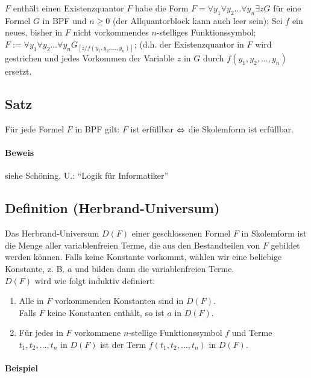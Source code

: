 \documentclass[a4paper,twoside,DIV15,BCOR12mm]{scrbook}
\begin{document}
\begin{codebox}
\li \While $F$ enthält einen Existenzquantor
\li     \Do
            $F$ habe die Form $F=\forall y_1\forall y_2\ldots\forall y_n\exists zG$ für eine Formel $G$ in BPF
\zi         und $n\geq 0$ (der Allquantorblock kann auch leer sein);
\li         Sei $f$ ein neues, bisher in $F$ nicht vorkommendes $n$-stelliges
\zi         Funktionssymbol;
\li         $F:=\forall y_1\forall y_2\ldots\forall y_nG_{[z/f(y_1,y_2,\ldots ,y_n)]}$; (d.h. der Existenzquantor in $F$ wird
\zi         gestrichen und jedes Vorkommen der Variable $z$ in $G$ durch 
\zi         $f(y_1,y_2,\ldots ,y_n)$ ersetzt.
    \End
\end{codebox}

\subsection{Satz}

Für jede Formel $F$ in BPF gilt: $F$ ist erfüllbar $\Leftrightarrow$ die Skolemform ist erfüllbar.
\paragraph{Beweis} siehe Schöning, U.: "`Logik für Informatiker"'  

\subsection{Definition (Herbrand-Universum)}

Das Herbrand-Universum $D(F)$ einer geschlossenen Formel $F$ in Skolemform ist die Menge aller variablenfreien Terme, die aus den Bestandteilen von $F$ gebildet werden können. Falls keine Konstante vorkommt, wählen wir eine beliebige Konstante, z. B. $a$ und bilden dann die variablenfreien Terme.\\
$D(F)$ wird wie folgt induktiv definiert:
\begin{enumerate}
\item Alle in $F$ vorkommenden Konstanten sind in $D(F)$.\\
Falls $F$ keine Konstanten enthält, so ist $a$ in $D(F)$.
\item Für jedes in $F$ vorkommene $n$-stellige Funktionssymbol $f$ und Terme $t_1,t_2,\ldots ,t_n$ in $D(F)$ ist der Term $f(t_1,t_2,\ldots ,t_n)$ in $D(F)$.
\end{enumerate}

\paragraph{Beispiel}
\end{document}
